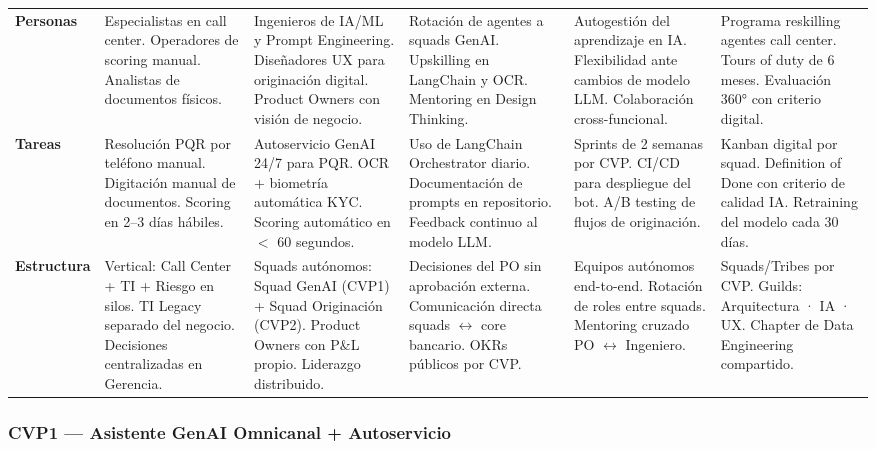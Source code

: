 \documentclass[12pt,letterpaper]{article}
\begin{document}
\begin{longtable}{%
  >{\bfseries\RaggedRight}p{1.8cm}
  >{\RaggedRight}p{2.6cm}
  >{\RaggedRight}p{2.8cm}
  >{\RaggedRight}p{2.6cm}
  >{\RaggedRight}p{2.6cm}
  >{\RaggedRight}p{2.4cm}}
\rowcolor{rowlightblue}
Personas &
Especialistas en call center. Operadores de scoring manual. Analistas de documentos físicos. &
Ingenieros de IA/ML y Prompt Engineering. Diseñadores UX para originación digital. Product Owners con visión de negocio. &
Rotación de agentes a squads GenAI. Upskilling en LangChain y OCR. Mentoring en Design Thinking. &
Autogestión del aprendizaje en IA. Flexibilidad ante cambios de modelo LLM. Colaboración cross-funcional. &
Programa reskilling agentes call center. Tours of duty de 6 meses. Evaluación 360° con criterio digital. \\

Tareas &
Resolución PQR por teléfono manual. Digitación manual de documentos. Scoring en 2–3 días hábiles. &
Autoservicio GenAI 24/7 para PQR. OCR + biometría automática KYC. Scoring automático en $<$ 60 segundos. &
Uso de LangChain Orchestrator diario. Documentación de prompts en repositorio. Feedback continuo al modelo LLM. &
Sprints de 2 semanas por CVP. CI/CD para despliegue del bot. A/B testing de flujos de originación. &
Kanban digital por squad. Definition of Done con criterio de calidad IA. Retraining del modelo cada 30 días. \\

\rowcolor{rowlightblue}
Estructura &
Vertical: Call Center + TI + Riesgo en silos. TI Legacy separado del negocio. Decisiones centralizadas en Gerencia. &
Squads autónomos: Squad GenAI (CVP1) + Squad Originación (CVP2). Product Owners con P\&L propio. Liderazgo distribuido. &
Decisiones del PO sin aprobación externa. Comunicación directa squads $\leftrightarrow$ core bancario. OKRs públicos por CVP. &
Equipos autónomos end-to-end. Rotación de roles entre squads. Mentoring cruzado PO $\leftrightarrow$ Ingeniero. &
Squads/Tribes por CVP. Guilds: Arquitectura · IA · UX. Chapter de Data Engineering compartido. \\

\end{longtable}
\endgroup

\bigskip

\subsubsection*{CVP1 — Asistente GenAI Omnicanal + Autoservicio}
\end{document}
